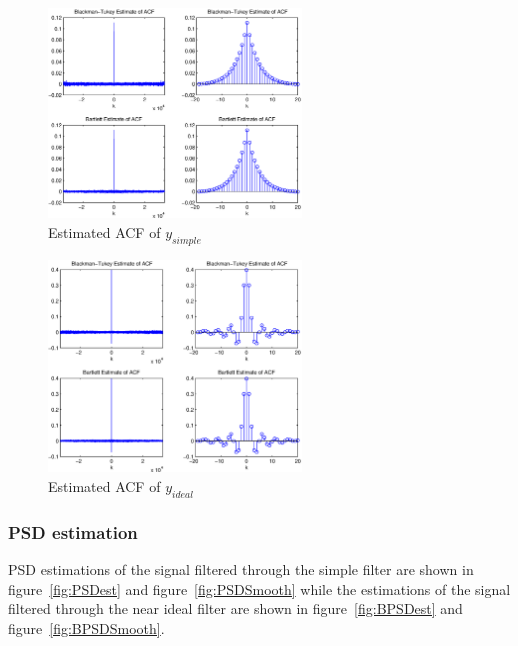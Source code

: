 \documentclass[10pt]{article}
\begin{document}
\begin{figure}[!hp]

    \begin{center}
      \includegraphics[width=0.6\textwidth]{EstACF}
    \caption{Estimated ACF of $y_{simple}$ \label{fig:ACFest}}
    \end{center}

\end{figure}

\begin{figure}[!hp]

    \begin{center}
      \includegraphics[width=0.6\textwidth]{BEstACF}
    \caption{Estimated ACF of $y_{ideal}$ \label{fig:BACFest}}
    \end{center}

\end{figure}

\clearpage

\subsubsection{PSD estimation}


PSD estimations of the signal filtered through the simple filter are
shown in figure~\ref{fig:PSDest} and figure~\ref{fig:PSDSmooth} while the estimations of the signal
filtered through the near ideal filter are shown in figure~\ref{fig:BPSDest} and
figure~\ref{fig:BPSDSmooth}.
\end{document}
